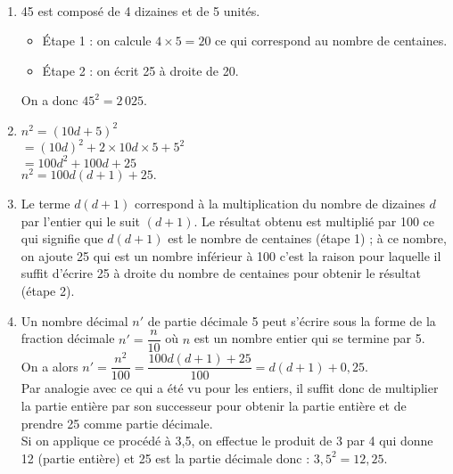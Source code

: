 \ \\ [-5mm]
   \begin{enumerate}
      \item 45 est composé de 4 dizaines et de 5 unités.
      \begin{itemize}
         \item Étape 1 : on calcule $4\times5 =20$ ce qui correspond au nombre de centaines.
         \item Étape 2 : on écrit 25 à droite de 20.
      \end{itemize}
      On a donc {\blue $45^2 =2\,025$.}
      \item $n^2 =(10d+5)^2$ \\
        \hspace*{0.8cm} $=(10d)^2+2\times10d\times5+5^2$ \\
         \hspace*{0.8cm} $=100d^2+100d+25$ \\
         \hspace*{0.4cm} {\blue $n^2 =100d(d+1)+25.$}
   \end{enumerate}

\Coupe

   \begin{enumerate}
   \setcounter{enumi}{2}
      \item Le terme \og $d(d+1)$ \fg{} correspond à la multiplication du nombre de dizaines $d$ par l'entier qui le suit $(d+1)$. Le résultat obtenu est multiplié par 100 ce qui signifie que $d(d+1)$ est le nombre de centaines (étape 1) ; à ce nombre, on ajoute 25 qui est un nombre inférieur à 100 c'est la raison pour laquelle il suffit d'écrire 25 à droite du nombre de centaines pour obtenir le résultat (étape 2).
      \item Un nombre décimal $n'$ de partie décimale 5 peut s'écrire sous la forme de la fraction décimale $n' =\dfrac{n}{10}$ où $n$ est un nombre entier qui se termine par 5. \\
         On a alors $n' =\dfrac{n^2}{100} =\dfrac{100d(d+1)+25}{100} =d(d+1)+0,25$. \\ [1mm]
         Par analogie avec ce qui a été vu pour les entiers, il suffit donc de multiplier la partie entière par son successeur pour obtenir la partie entière et de prendre 25 comme partie décimale. \\
         Si on applique ce procédé à 3,5, on effectue le produit de 3 par 4 qui donne 12 (partie entière) et 25 est la partie décimale donc : {\blue $3,5^2 =12,25$.}
   \end{enumerate}

